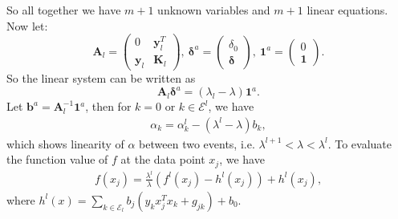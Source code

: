 \documentclass[10pt]{article}
\theoremstyle{definition}
\begin{document}
So all together we have $m+1$ unknown variables and $m+1$ linear equations. Now let:
\[
\mathbf{A}_l = 
\left( \begin{array}{cc}
0 & \mathbf{y}_l^T \\
\mathbf{y}_l & \mathbf{K}_l 
\end{array}\right), \
\boldsymbol{\delta}^a = 
\left( \begin{array}{c}
\delta_0 \\
\boldsymbol{\delta}
\end{array}
\right), \ 
\textbf{1}^a = 
\left( \begin{array}{c}
0 \\
\textbf{1}
\end{array}
\right). 
\]
So the linear system can be written as
\[
\mathbf{A}_l\boldsymbol{\delta}^a = (\lambda_l-\lambda)\textbf{1}^a.
\]
Let $\textbf{b}^a = \mathbf{A}_l^{-1}\textbf{1}^a$, then for $k=0$ or $k \in \mathcal E^l$, we have
\begin{align}
\label{eq:alpha}
\alpha_k = \alpha_k^l - (\lambda^l-\lambda)b_k,
\end{align}
which shows linearity of $\alpha$ between two events, i.e. $\lambda^{l+1}<\lambda<\lambda^{l}$. To evaluate the function value of $f$ at the data point $x_j$, we have
\begin{align}
\label{eq:fxj}
f(x_j) = \frac{\lambda^l}{\lambda}(f^l(x_j)-h^l(x_j))+h^l(x_j),
\end{align}
where $h^l(x) = \sum_{k\in\mathcal E_l}b_j(y_kx_j^Tx_k+g_{jk})+b_0$.
\end{document}
